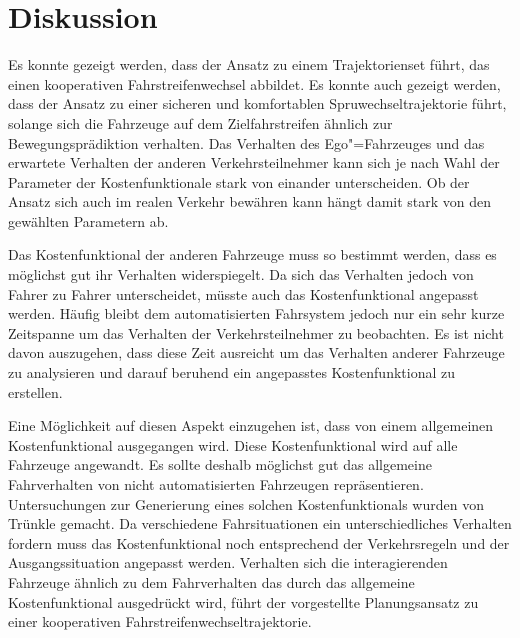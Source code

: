 \section{Diskussion}
\label{sec:diskussion}
Es konnte gezeigt werden, dass der Ansatz zu einem Trajektorienset f\"uhrt, das einen kooperativen Fahrstreifenwechsel abbildet.
Es konnte auch gezeigt werden, dass der Ansatz zu einer sicheren und komfortablen Spruwechseltrajektorie f\"uhrt, solange sich die Fahrzeuge auf dem Zielfahrstreifen \"ahnlich zur Bewegungspr\"adiktion verhalten.
Das Verhalten des Ego"=Fahrzeuges und das erwartete Verhalten der anderen Verkehrsteilnehmer kann sich je nach Wahl der Parameter der Kostenfunktionale stark von einander unterscheiden.
Ob der Ansatz sich auch im realen Verkehr bew\"ahren kann h\"angt damit stark von den gew\"ahlten Parametern ab.

Das Kostenfunktional der anderen Fahrzeuge muss so bestimmt werden, dass es m\"oglichst gut ihr Verhalten widerspiegelt.
Da sich das Verhalten jedoch von Fahrer zu Fahrer unterscheidet, m\"usste auch das Kostenfunktional angepasst werden.
H\"aufig bleibt dem automatisierten Fahrsystem jedoch nur ein sehr kurze Zeitspanne um das Verhalten der Verkehrsteilnehmer zu beobachten.
Es ist nicht davon auszugehen, dass diese Zeit ausreicht um das Verhalten anderer Fahrzeuge zu analysieren und darauf beruhend ein angepasstes Kostenfunktional zu erstellen.

Eine M\"oglichkeit auf diesen Aspekt einzugehen ist, dass von einem allgemeinen Kostenfunktional ausgegangen wird.
Diese Kostenfunktional wird auf alle Fahrzeuge angewandt.
Es sollte deshalb m\"oglichst gut das allgemeine Fahrverhalten von nicht automatisierten Fahrzeugen repr\"asentieren.
Untersuchungen zur Generierung eines solchen Kostenfunktionals wurden von Tr\"unkle \cite{Trunkel} gemacht.
Da verschiedene Fahrsituationen ein unterschiedliches Verhalten fordern muss das Kostenfunktional noch entsprechend der Verkehrsregeln und der Ausgangssituation angepasst werden.
Verhalten sich die interagierenden Fahrzeuge \"ahnlich zu dem Fahrverhalten das durch das allgemeine Kostenfunktional ausgedr\"uckt wird, f\"uhrt der vorgestellte Planungsansatz zu einer kooperativen Fahrstreifenwechseltrajektorie.

